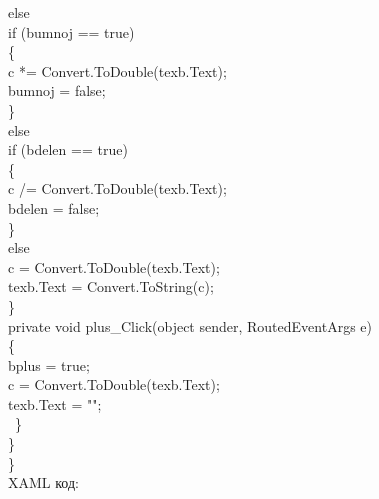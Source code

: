            else\\
            if (bumnoj == true)\\
            \{\\
                c *= Convert.ToDouble(texb.Text);\\
                bumnoj = false;\\
            \}\\

            else\\
            if (bdelen == true)\\
            \{\\
                c /= Convert.ToDouble(texb.Text);\\
                bdelen = false;\\
            \}\\

            else\\
                c = Convert.ToDouble(texb.Text);\\

            texb.Text = Convert.ToString(c); \\             
        \}\\

        private void plus\_Click(object sender, RoutedEventArgs e)\\
        \{\\
            bplus = true;\\
            c = Convert.ToDouble(texb.Text);\\
            texb.Text = "";\\
\
        \}\\
   \}\\
\}\\



\newpage
XAML код:\\

